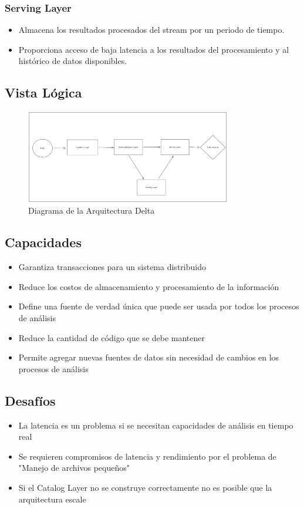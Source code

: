 \subsubsection{Serving Layer}
\begin{itemize}
    \item Almacena los resultados procesados del stream por un periodo de tiempo.
    \item Proporciona acceso de baja latencia a los resultados del procesamiento y al histórico de datos disponibles.
\end{itemize}

\newpage
\subsection{Vista Lógica}

\begin{figure}[h]
\centering
\includegraphics[width=0.8\textwidth]{teorico/arquitecturas/delta.png}
\caption{Diagrama de la Arquitectura Delta}
\label{fig:arquitectura_delta}
\end{figure}

\subsection{Capacidades}
\begin{itemize}
    \item Garantiza transacciones para un sistema distribuido
    \item Reduce los costos de almacenamiento y procesamiento de la información 
    \item Define una fuente de verdad única que puede ser usada por todos los procesos de análisis
    \item Reduce la cantidad de código que se debe mantener
    \item Permite agregar nuevas fuentes de datos sin necesidad de cambios en los procesos de análisis
\end{itemize}

\subsection{Desafíos}
\begin{itemize}
    \item La latencia es un problema si se necesitan capacidades de análisis en tiempo real
    \item Se requieren compromisos de latencia y rendimiento por el problema de "Manejo de archivos pequeños"
    \item Si el Catalog Layer no se construye correctamente no es posible que la arquitectura escale
\end{itemize}
\newpage